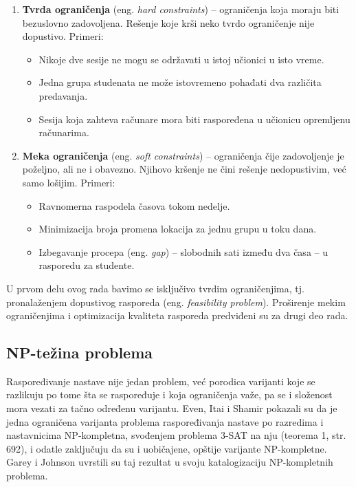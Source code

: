 \documentclass[12pt,oneside]{memoir}
\begin{document}
\begin{enumerate}
\item \textbf{Tvrda ograničenja} (eng. \emph{hard constraints}) --
  ograničenja koja moraju biti bezuslovno zadovoljena. Rešenje koje
  krši neko tvrdo ograničenje nije dopustivo. Primeri:
  \begin{itemize}
  \item Nikoje dve sesije ne mogu se održavati u istoj učionici u
    isto vreme.
  \item Jedna grupa studenata ne može istovremeno pohađati dva
    različita predavanja.
  \item Sesija koja zahteva računare mora biti raspoređena u
    učionicu opremljenu računarima.
  \end{itemize}

\item \textbf{Meka ograničenja} (eng. \emph{soft constraints}) --
  ograničenja čije zadovoljenje je poželjno, ali ne i obavezno.
  Njihovo kršenje ne čini rešenje nedopustivim, već samo lošijim.
  Primeri:
  \begin{itemize}
  \item Ravnomerna raspodela časova tokom nedelje.
  \item Minimizacija broja promena lokacija za jednu grupu u toku dana.
  \item Izbegavanje procepa (eng. \emph{gap}) -- slobodnih sati između
    dva časa -- u rasporedu za studente.
  \end{itemize}
\end{enumerate}

U prvom delu ovog rada bavimo se isključivo tvrdim ograničenjima, tj.
pronalaženjem dopustivog rasporeda (eng. \emph{feasibility problem}).
Proširenje mekim ograničenjima i optimizacija kvaliteta rasporeda
predviđeni su za drugi deo rada.

\subsection{NP-težina problema}

Raspoređivanje nastave nije jedan problem, već porodica varijanti koje
se razlikuju po tome šta se raspoređuje i koja ograničenja važe, pa se
i složenost mora vezati za tačno određenu varijantu. Even, Itai i
Shamir \cite{even1975} pokazali su da je jedna ograničena varijanta
problema raspoređivanja nastave po razredima i nastavnicima
NP-kompletna, svođenjem problema 3-SAT na nju (teorema 1, str. 692), i
odatle zaključuju da su i uobičajene, opštije varijante NP-kompletne.
Garey i Johnson \cite{garey1979} uvrstili su taj rezultat u svoju
katalogizaciju NP-kompletnih problema.
\end{document}
